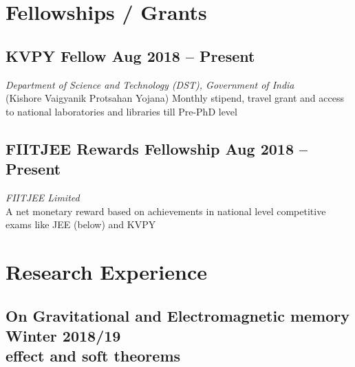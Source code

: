 \documentclass[11pt, a4paper]{article}
\begin{document}
\section{Fellowships / Grants}

\subsection{KVPY Fellow \hfill \large{Aug 2018 -- Present}}
\hspace{0.02\linewidth}
\parbox{0.88\linewidth}{
    \textit{Department of Science and Technology (DST), Government of India} \\
    {\small (Kishore Vaigyanik Protsahan Yojana) Monthly stipend, travel grant and access to national laboratories and libraries till Pre-PhD level}
}

\subsection{FIITJEE Rewards Fellowship \hfill \large{Aug 2018 -- Present}}
\hspace{0.02\linewidth}
\parbox{0.88\linewidth}{
    \textit{FIITJEE Limited} \\
    {\small A net monetary reward based on achievements in national level competitive exams like JEE (below) and KVPY}
}


\section{Research Experience}

\subsection{\large On Gravitational and Electromagnetic memory \hfill \large{Winter 2018/19} \\ effect and soft theorems}
\end{document}
